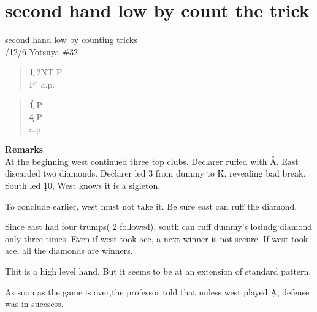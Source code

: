 \section{second hand low by count the trick}
second hand low by counting tricks\\
/12/6 Yotsuya  \#32
\begin{quote}
%
  {}%
  {}
  {}%
  {}%
\end{quote}
\begin{quote}
\begin{bidding}
1\c \> 2NT  \> P \h \\
P \h \>  a.p.
\end{bidding}
\end{quote}

\begin{quote}
\begin{bidding}
1\c {}\h  \> P \h \\
4\c {}\d \> P \h \\
a.p.
\end{bidding}
\end{quote}
{\bf Remarks}\\

At the beginning west continued three top clubs.
Declarer ruffed with \h A. East discarded two diamonds.
Declarer led \h 3 from dummy to \h K, revealing bad break.
South led \d 10, West knows it is a sigleton,

To conclude earlier, west must not take it. Be sure east can 
ruff the diamond.

Since east had four trumps( \h 2 followed), south can ruff
dummy's losindg diamond only three times. Even if west took ace,
a next winner is not secure. If west took ace, all the diamonds
are winners.

Thit is a high level hand. But it seems to be at an extension of
standard pattern.

As soon as the game is over,the professor told that unless west played
\d A, defense was in succsess.

